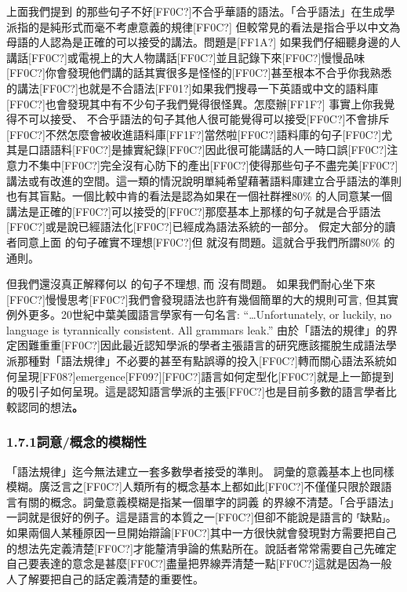 上面我們提到  的那些句子不好[FF0C?]不合乎華語的語法。「合乎語法」在生成學派指的是純形式而毫不考慮意義的規律[FF0C?] 但較常見的看法是指合乎以中文為母語的人認為是正確的可以接受的講法。問題是[FF1A?] 如果我們仔細聽身邊的人講話[FF0C?]或電視上的大人物講話[FF0C?]並且記錄下來[FF0C?]慢慢品味[FF0C?]你會發現他們講的話其實很多是怪怪的[FF0C?]甚至根本不合乎你我熟悉的講法[FF0C?]也就是不合語法[FF01?]如果我們搜尋一下英語或中文的語料庫[FF0C?]也會發現其中有不少句子我們覺得很怪異。怎麼辦[FF1F?] 事實上你我覺得不可以接受、 不合乎語法的句子其他人很可能覺得可以接受[FF0C?]不會排斥[FF0C?]不然怎麼會被收進語料庫[FF1F?]當然啦[FF0C?]語料庫的句子[FF0C?]尤其是口語語料[FF0C?]是據實紀錄[FF0C?]因此很可能講話的人一時口誤[FF0C?]注意力不集中[FF0C?]完全沒有心防下的產出[FF0C?]使得那些句子不盡完美[FF0C?]講法或有改進的空間。這一類的情況說明單純希望藉著語料庫建立合乎語法的準則也有其盲點。一個比較中肯的看法是認為如果在一個社群裡80\% 的人同意某一個講法是正確的[FF0C?]可以接受的[FF0C?]那麼基本上那樣的句子就是合乎語法[FF0C?]或是說已經語法化[FF0C?]已經成為語法系統的一部分。 假定大部分的讀者同意上面  的句子確實不理想[FF0C?]但  就沒有問題。這就合乎我們所謂80\% 的通則。

但我們還沒真正解釋何以 的句子不理想, 而 沒有問題。 如果我們耐心坐下來[FF0C?]慢慢思考[FF0C?]我們會發現語法也許有幾個簡單的大的規則可言, 但其實例外更多。20世紀中葉美國語言學家\citet[39]{Sapir1921}有一句名言: “…Unfortunately, or luckily, no language is tyrannically consistent. All grammars leak.” 由於「語法的規律」的界定困難重重[FF0C?]因此最近認知學派的學者主張語言的研究應該擺脫生成語法學派那種對「語法規律」不必要的甚至有點誤導的投入[FF0C?]轉而關心語法系統如何呈現[FF08?]emergence[FF09?][FF0C?]語言如何定型化[FF0C?]就是上一節提到的吸引子如何呈現。這是認知語言學派的主張[FF0C?]也是目前多數的語言學者比較認同的想法\textbf{。} 

\subsubsection{1.7.1詞意/概念的模糊性}

「語法規律」迄今無法建立一套多數學者接受的準則。 詞彙的意義基本上也同樣模糊。廣泛言之[FF0C?]人類所有的概念基本上都如此[FF0C?]不僅僅只限於跟語言有關的概念。詞彙意義模糊是指某一個單字的詞義 的界線不清楚。「合乎語法」一詞就是很好的例子。這是語言的本質之一[FF0C?]但卻不能說是語言的 ⸢缺點⸥。如果兩個人某種原因一旦開始辯論[FF0C?]其中一方很快就會發現對方需要把自己的想法先定義清楚[FF0C?]才能釐清爭論的焦點所在。說話者常常需要自己先確定自己要表達的意念是甚麼[FF0C?]盡量把界線弄清楚一點[FF0C?]這就是因為一般人了解要把自己的話定義清楚的重要性。   

